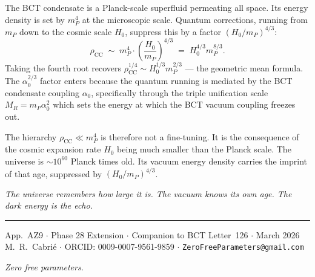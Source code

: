 \documentclass[aps,prl,twocolumn,showpacs,preprintnumbers]{revtex4-2}
\newcommand{\azero}{\alpha_0}
\newcommand{\mP}{m_P}
\newcommand{\MR}{M_R}
\newcommand{\rhoCC}{\rho_{\mathrm{CC}}}
\newcommand{\Hzero}{H_0}
\begin{document}
The BCT condensate is a Planck-scale superfluid permeating all space.
Its energy density is set by $\mP^4$ at the microscopic scale. Quantum
corrections, running from $\mP$ down to the cosmic scale $\Hzero$, suppress
this by a factor $(\Hzero/\mP)^{4/3}$:
\begin{equation}
  \rhoCC \;\sim\; \mP^4 \cdot \left(\frac{\Hzero}{\mP}\right)^{4/3}
  \;=\; \Hzero^{4/3}\mP^{8/3}.
\end{equation}
Taking the fourth root recovers $\rhoCC^{1/4} \sim \Hzero^{1/3}\mP^{2/3}$
--- the geometric mean formula. The $\azero^{2/3}$ factor enters because
the quantum running is mediated by the BCT condensate coupling $\azero$,
specifically through the triple unification scale $\MR = \mP\azero^2$
which sets the energy at which the BCT vacuum coupling freezes out.

The hierarchy $\rhoCC \ll \mP^4$ is therefore not a fine-tuning. It is the
consequence of the cosmic expansion rate $\Hzero$ being much smaller than
the Planck scale. The universe is $\sim 10^{60}$ Planck times old. Its
vacuum energy density carries the imprint of that age, suppressed by
$(\Hzero/\mP)^{4/3}$.

\medskip
\noindent\textit{The universe remembers how large it is. The vacuum knows
its own age. The dark energy is the echo.}

\bigskip
\begin{center}
\rule{0.5\textwidth}{0.4pt}

\smallskip
App.~AZ9 $\cdot$ Phase 28 Extension $\cdot$
Companion to BCT Letter~126 $\cdot$ March 2026\\
M.~R.~Cabri\'e $\cdot$ ORCID: 0009-0007-9561-9859 $\cdot$
\texttt{ZeroFreeParameters@gmail.com}

\smallskip
\textit{Zero free parameters.}
\end{center}
\end{document}

